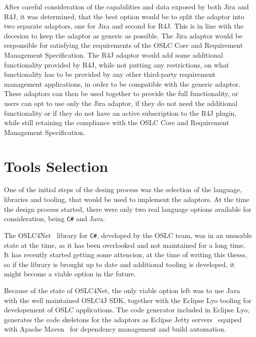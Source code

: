 After careful consideration of the capabilities and data exposed by both Jira and R4J, it was determined, that the best option would be to split the adaptor into two separate adaptors, one for Jira and second for R4J. This is in line with the decesion to keep the adaptor as generic as possible. The Jira adaptor would be responsible for satisfying the requirements of the OSLC Core and Requirement Management Specification. The R4J adaptor would add some additional functionality provided by R4J, while not putting any restrictions, on what functionality has to be provided by any other third-party requirement management applications, in order to be compatible with the generic adaptor. These adaptors can then be used together to provide the full functionality, or users can opt to use only the Jira adaptor, if they do not need the additional functionality or if they do not have an active subscription to the R4J plugin, while still retaining the compliance with the OSLC Core and Requirement Management Specification.

\section{Tools Selection}
One of the initial steps of the desing process was the selection of the language, libraries and tooling, that would be used to implement the adaptors. At the time the design process started, there were only two real language options available for consideration, being \texttt{C\#} and Java. 

The OSLC4Net \cite{oslc4net} library for \texttt{C\#}, developed by the OSLC team, was in an unusable state at the time, as it has been overlooked and not maintained for a long time. It has recently started getting some attencion, at the time of writing this thesss, so if the library is brought up to date and additional tooling is developed, it might become a viable option in the future.

Because of the state of OSLC4Net, the only viable option left was to use Java with the well maintained OSLC4J SDK, together with the Eclipse Lyo tooling for developement of OSLC applications. The code generator included in Eclipse Lyo, generates the code skeletons for the adaptors as Eclipse Jetty servers \cite{jetty} equiped with Apache Maven \cite{maven} for dependency management and build automation.

